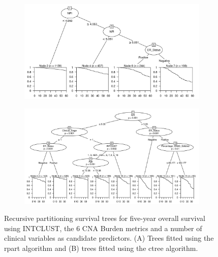 \begin{figure}[!htb]
\centering

\vspace{1cm}

\begin{subfigure}{\textwidth}
\subcaption{}
\includegraphics[width=1\textwidth]{../figures/Appendices/Appendix_B/Clin_PartyKit_Survival_Burden_FiveYearOS_INTCLUST.png}
\end{subfigure}

\vspace{2cm}

\begin{subfigure}{\textwidth}
\subcaption{}
\includegraphics[width=1\textwidth]{../figures/Appendices/Appendix_B/Clin_Ctree_Survival_Burden_FiveYearOS_INTCLUST.png}
\end{subfigure}

\vspace{1cm}

\caption[Recursive partitioning survival trees for five-year overall survival using INTCLUST, the 6 CNA Burden metrics and a number of clinical variables as candidate predictors.]{Recursive partitioning survival trees for five-year overall survival using INTCLUST, the 6 CNA Burden metrics and a number of clinical variables as candidate predictors. (A) Trees fitted using the rpart algorithm and (B) trees fitted using the ctree algorithm.}
\end{figure}

